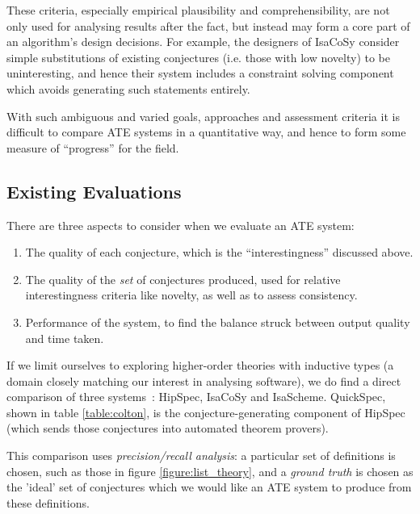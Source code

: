 These criteria, especially empirical plausibility and comprehensibility, are not
only used for analysing results after the fact, but instead may form a core part
of an algorithm's design decisions. For example, the designers of IsaCoSy
consider simple substitutions of existing conjectures (i.e. those with low
novelty) to be uninteresting, and hence their system includes a constraint
solving component which avoids generating such statements entirely.

With such ambiguous and varied goals, approaches and assessment criteria it is
difficult to compare ATE systems in a quantitative way, and hence to form some
measure of ``progress'' for the field.

\subsection{Existing Evaluations}
\label{sec:existing}

There are three aspects to consider when we evaluate an ATE system:

\begin{enumerate}
\item The quality of each conjecture, which is the ``interestingness'' discussed
  above.
\item The quality of the \emph{set} of conjectures produced, used for relative
  interestingness criteria like novelty, as well as to assess consistency.
\item Performance of the system, to find the balance struck between output
  quality and time taken.
\end{enumerate}


If we limit ourselves to exploring higher-order theories with inductive types
(a domain closely matching our interest in analysing software), we do find a
direct comparison of three systems~\cite{claessen2013automating}: HipSpec,
IsaCoSy and IsaScheme. QuickSpec, shown in table \ref{table:colton}, is the
conjecture-generating component of HipSpec (which sends those conjectures into
automated theorem provers).

This comparison uses \emph{precision/recall analysis}: a particular set of
definitions is chosen, such as those in figure \ref{figure:list_theory}, and a
\emph{ground truth} is chosen as the 'ideal' set of conjectures which we would
like an ATE system to produce from these definitions.

